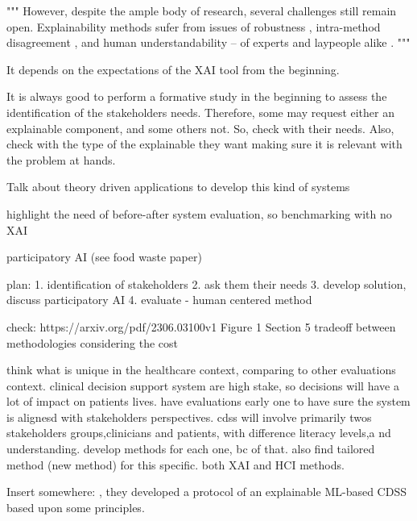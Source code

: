 """ %
However, despite the ample body of research, several challenges
still remain open. Explainability methods sufer from issues of robustness \cite{slack2020fooling}, intra-method disagreement \cite{krishna2022disagreement}, and human understandability \cite{zhang2019dissonance} – of experts and laypeople alike \cite{balayn2022can}.
"""


It depends on the expectations of the XAI tool from the beginning. 

It is always good to perform a formative study in the beginning to assess the identification of the stakeholders needs. Therefore, some may request either an explainable component, and some others not. So, check with their needs. Also, check with the type of the explainable they want making sure it is relevant with the problem at hands.


Talk about theory driven applications to develop this kind of systems


highlight the need of before-after system evaluation, so benchmarking with no XAI 

participatory AI (see food waste paper) 




plan:
1. identification of stakeholders 
2. ask them their needs 
3. develop solution, discuss participatory AI 
4. evaluate - human centered method 



check: https://arxiv.org/pdf/2306.03100v1
Figure 1
Section 5
tradeoff between methodologies considering the cost 

think what is unique in the healthcare context, comparing to other evaluations context. clinical decision support system are high stake, so decisions will have a lot of impact on patients lives. have evaluations early one to have sure the system is alignesd with stakeholders perspectives. cdss will involve primarily twos stakeholders groups,clinicians and patients, with difference literacy levels,a nd understanding. develop methods for each one, bc of that. also find tailored  method (new method) for this specific. both XAI and HCI methods. 

Insert somewhere: \cite{pumplun2023bringing}, they developed a protocol of an explainable ML-based CDSS based upon some principles. 
